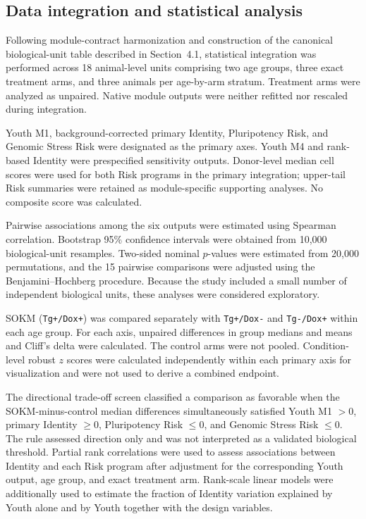 \subsection{Data integration and statistical analysis}
\label{sec:integration-statistics}

Following module-contract harmonization and construction of the canonical
biological-unit table described in Section~4.1, statistical integration was
performed across 18 animal-level units comprising two age groups, three exact
treatment arms, and three animals per age-by-arm stratum. Treatment arms were
analyzed as unpaired. Native module outputs were neither refitted nor
rescaled during integration.

Youth M1, background-corrected primary Identity, Pluripotency Risk, and Genomic
Stress Risk were designated as the primary axes. Youth M4 and rank-based
Identity were prespecified sensitivity outputs. Donor-level median cell scores
were used for both Risk programs in the primary integration; upper-tail Risk
summaries were retained as module-specific supporting analyses. No composite
score was calculated.

Pairwise associations among the six outputs were estimated using Spearman
correlation. Bootstrap 95\% confidence intervals were obtained from 10,000
biological-unit resamples. Two-sided nominal $p$-values were estimated from
20,000 permutations, and the 15 pairwise comparisons were adjusted using the
Benjamini--Hochberg procedure. Because the study included a small number of
independent biological units, these analyses were considered exploratory.

SOKM (\texttt{Tg+/Dox+}) was compared separately with
\texttt{Tg+/Dox-} and \texttt{Tg-/Dox+} within each age group. For each axis,
unpaired differences in group medians and means and Cliff's delta were
calculated. The control arms were not pooled. Condition-level robust $z$ scores
were calculated independently within each primary axis for visualization and
were not used to derive a combined endpoint.

The directional trade-off screen classified a comparison as favorable when
the SOKM-minus-control median differences simultaneously satisfied Youth M1
$>0$, primary Identity $\geq0$, Pluripotency Risk $\leq0$, and Genomic Stress
Risk $\leq0$. The rule assessed direction only and was not interpreted as a
validated biological threshold. Partial rank correlations were used to assess
associations between Identity and each Risk program after adjustment for the
corresponding Youth output, age group, and exact treatment arm. Rank-scale
linear models were additionally used to estimate the fraction of Identity
variation explained by Youth alone and by Youth together with the design
variables.

